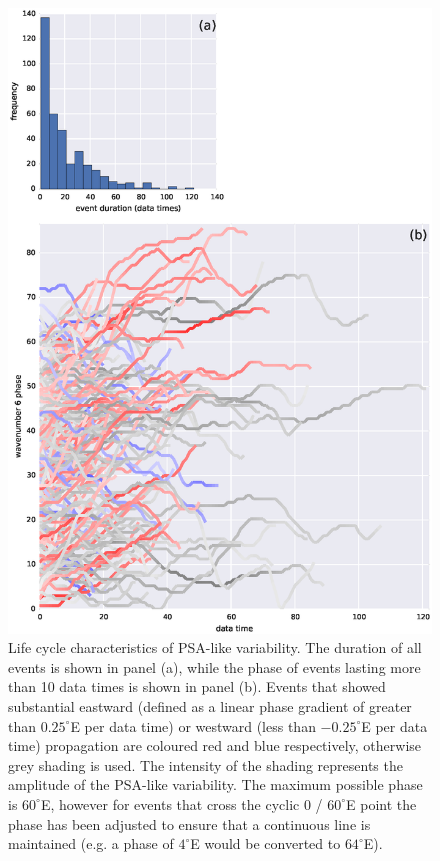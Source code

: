 \begin{figure}
\begin{center}
\includegraphics[width=0.8\columnwidth]{figures/psa/psa-event-summary_wave6-duration-gt10_ERAInterim_500hPa-lat10S10Nmean-lon115E235Ezeropad_030day-runmean-anom-wrt-all_native-np20N260E.eps}
\caption[Life cycle characteristics of PSA-like variability]{\label{fig:lifecycle}
Life cycle characteristics of PSA-like variability. The duration of all events is shown in panel (a), while the phase of events lasting more than 10 data times is shown in panel (b). Events that showed substantial eastward (defined as a linear phase gradient of greater than $0.25^{\circ}$E per data time) or westward (less than $-0.25^{\circ}$E per data time) propagation are coloured red and blue respectively, otherwise grey shading is used. The intensity of the shading represents the amplitude of the PSA-like variability. The maximum possible phase is $60^{\circ}$E, however for events that cross the cyclic 0 / $60^{\circ}$E point the phase has been adjusted to ensure that a continuous line is maintained (e.g. a phase of $4^{\circ}$E would be converted to $64^{\circ}$E). %
}
\end{center}
\end{figure}


